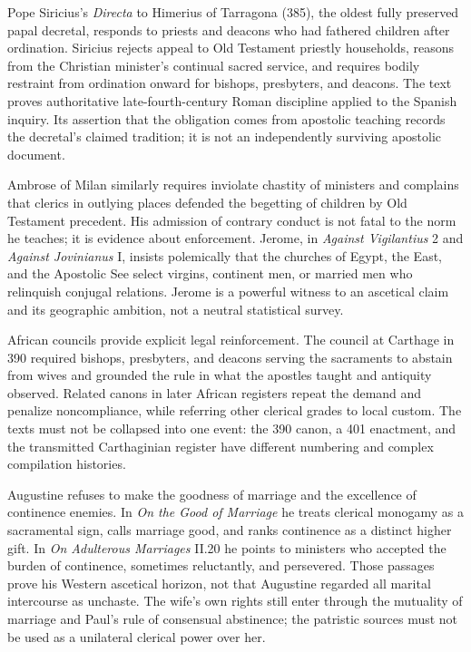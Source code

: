Pope Siricius's \emph{Directa} to Himerius of Tarragona (385), the oldest fully preserved papal decretal, responds to priests and deacons who had fathered children after ordination. Siricius rejects appeal to Old Testament priestly households, reasons from the Christian minister's continual sacred service, and requires bodily restraint from ordination onward for bishops, presbyters, and deacons. The text proves authoritative late-fourth-century Roman discipline applied to the Spanish inquiry. Its assertion that the obligation comes from apostolic teaching records the decretal's claimed tradition; it is not an independently surviving apostolic document.

Ambrose of Milan similarly requires inviolate chastity of ministers and complains that clerics in outlying places defended the begetting of children by Old Testament precedent. His admission of contrary conduct is not fatal to the norm he teaches; it is evidence about enforcement. Jerome, in \emph{Against Vigilantius} 2 and \emph{Against Jovinianus} I, insists polemically that the churches of Egypt, the East, and the Apostolic See select virgins, continent men, or married men who relinquish conjugal relations. Jerome is a powerful witness to an ascetical claim and its geographic ambition, not a neutral statistical survey.

African councils provide explicit legal reinforcement. The council at Carthage in 390 required bishops, presbyters, and deacons serving the sacraments to abstain from wives and grounded the rule in what the apostles taught and antiquity observed. Related canons in later African registers repeat the demand and penalize noncompliance, while referring other clerical grades to local custom. The texts must not be collapsed into one event: the 390 canon, a 401 enactment, and the transmitted Carthaginian register have different numbering and complex compilation histories.

Augustine refuses to make the goodness of marriage and the excellence of continence enemies. In \emph{On the Good of Marriage} he treats clerical monogamy as a sacramental sign, calls marriage good, and ranks continence as a distinct higher gift. In \emph{On Adulterous Marriages} II.20 he points to ministers who accepted the burden of continence, sometimes reluctantly, and persevered. Those passages prove his Western ascetical horizon, not that Augustine regarded all marital intercourse as unchaste. The wife's own rights still enter through the mutuality of marriage and Paul's rule of consensual abstinence; the patristic sources must not be used as a unilateral clerical power over her.

